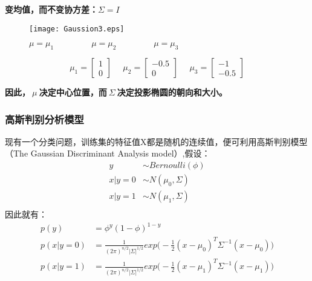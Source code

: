 \noindent\textbf{变均值，而不变协方差：}$\Sigma=I$
\begin{figure}[!h]
  \centering
  \texttt{[image: Gaussion3.eps]}
  \caption{$\mu=\mu_1~~~~~~~~~~~~~~~~~~~~\mu=\mu_2~~~~~~~~~~~~~~~~~~~~\mu=\mu_3$}
\end{figure}
$$\mu_1=\begin{bmatrix}
      1  \\
      0
    \end{bmatrix}~~~~~~\mu_2=\begin{bmatrix}
                      -0.5\\
                       0
                    \end{bmatrix}~~~~~~\mu_3=\begin{bmatrix}
                                            -1\\
                                            -0.5
                                          \end{bmatrix}$$

\noindent\textbf{因此，$~\mu~$决定中心位置，而$~\Sigma~$决定投影椭圆的朝向和大小。}

\subsubsection{高斯判别分析模型}
现有一个分类问题，训练集的特征值X都是随机的连续值，便可利用高斯判别模型（The Gaussian Discriminant Analysis model）,假设：
\begin{equation}\nonumber
\begin{split}
  y &\sim Bernoulli(\phi)\\
  x|y=0 &\sim N(\mu_0,\Sigma)\\
  x|y=1 &\sim N(\mu_1,\Sigma)\\
\end{split}
\end{equation}
因此就有：
\begin{equation}\nonumber
\begin{split}
  p(y)&=\phi^y(1-\phi)^{1-y}\\
  p(x|y=0)&=\frac{1}{(2\pi)^{n/2}|\Sigma|^{1/2}}exp\bigg(-\frac{1}{2}(x-\mu_0)^T\Sigma^{-1}(x-\mu_0)\bigg)\\
  p(x|y=1)&=\frac{1}{(2\pi)^{n/2}|\Sigma|^{1/2}}exp\bigg(-\frac{1}{2}(x-\mu_1)^T\Sigma^{-1}(x-\mu_1)\bigg)\\
\end{split}
\end{equation}


